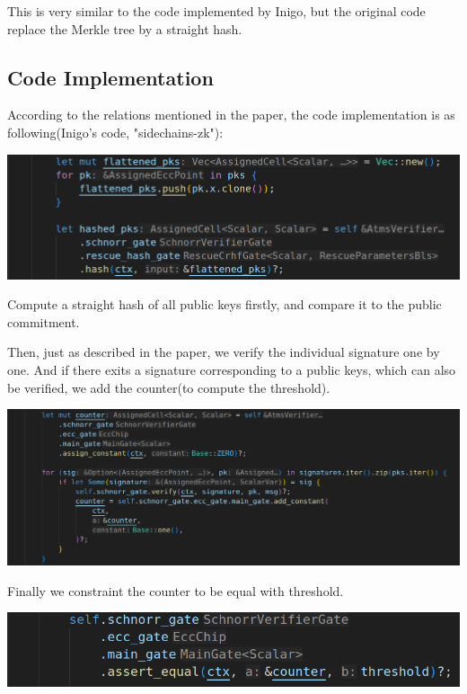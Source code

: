 \documentclass{article}
\begin{document}
This is very similar to the code implemented by Inigo, but the original code replace the Merkle tree by a straight hash.

\subsection{Code Implementation}

According to the relations mentioned in the paper, the code implementation is as following(Inigo's code, "sidechains-zk"):

\vspace{0.5cm}

\includegraphics[width=1\linewidth]{inigo_atms_code_keyhash.png}
\vspace{0.1cm}

Compute a straight hash of all public keys firstly, and compare it to the public commitment.

Then, just as described in the paper, we verify the individual signature one by one. And if there exits a signature corresponding to a public keys, which can also be verified, we add the counter(to compute the threshold).


\vspace{0.5cm}

\includegraphics[width=1\linewidth]{inigo_atms_code_verify.png}
\vspace{0.1cm}


Finally we constraint the counter to be equal with threshold.

\vspace{0.5cm}

\includegraphics[width=1\linewidth]{inigo_atms_code_threshold.png}
\vspace{0.1cm}
\end{document}
